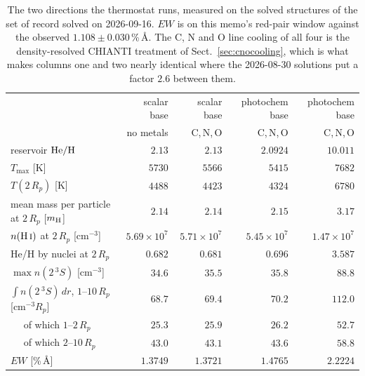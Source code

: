 \documentclass[english,a4paper]{my_memo}
\begin{document}
\begin{table}[htbp]\centering\small
\caption{The two directions the thermostat runs, measured on the solved
structures of the set of record solved on 2026-09-16. $EW$ is on this memo's red-pair window
against the observed $1.108 \pm 0.030$\,\%\,\AA. The C, N and O line cooling
of all four is the density-resolved CHIANTI treatment of
Sect.~\ref{sec:cnocooling}, which is what makes columns one and two nearly
identical where the 2026-08-30 solutions put a factor $2.6$ between them.}
\label{tab:thermostat}
\begin{tabular}{lrrrr}
\toprule
 & scalar base & scalar base & photochem base & photochem base \\
 & no metals & C,\,N,\,O & C,\,N,\,O & C,\,N,\,O \\
reservoir ${\rm He/H}$ & $2.13$ & $2.13$ & $2.0924$ & $10.011$ \\
\midrule
$T_{\max}$ [K]                                   & $5730$ & $5566$ & $5415$ & $7682$ \\
$T(2\,R_p)$ [K]                                  & $4488$ & $4423$ & $4324$ & $6780$ \\
mean mass per particle at $2\,R_p$ [$m_{\rm H}$] & $2.14$ & $2.14$ & $2.15$ & $3.17$ \\
$n({\rm H\,\textsc{i}})$ at $2\,R_p$ [cm$^{-3}$] & $5.69\times10^{7}$ & $5.71\times10^{7}$ & $5.45\times10^{7}$ & $1.47\times10^{7}$ \\
He/H by nuclei at $2\,R_p$                       & $0.682$ & $0.681$ & $0.696$ & $3.587$ \\
$\max n(2\,^3S)$ [cm$^{-3}$]                     & $34.6$ & $35.5$ & $35.8$ & $88.8$ \\
$\int n(2\,^3S)\,dr$, $1$--$10\,R_p$ [cm$^{-3}R_p$] & $68.7$ & $69.4$ & $70.2$ & $112.0$ \\
$\quad$ of which $1$--$2\,R_p$                   & $25.3$ & $25.9$ & $26.2$ & $52.7$ \\
$\quad$ of which $2$--$10\,R_p$                  & $43.0$ & $43.1$ & $43.6$ & $58.8$ \\
$EW$ [\%\,\AA]                                   & $1.3749$ & $1.3721$ & $1.4765$ & $2.2224$ \\
\bottomrule
\end{tabular}
\end{table}
\end{document}
